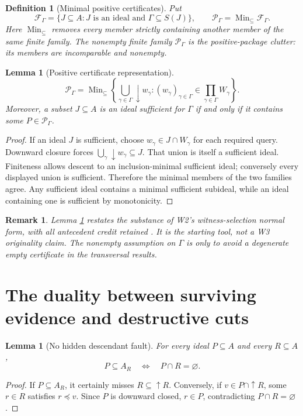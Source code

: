 \documentclass[11pt,letterpaper]{article}
\newtheorem{lemma}[theorem]{Lemma}
\newtheorem{definition}[theorem]{Definition}
\newtheorem{remark}[theorem]{Remark}
\DeclareMathOperator{\Min}{Min}
\newcommand{\calP}{\mathcal P}
\newcommand{\Gam}{\Gamma}
\begin{document}
\begin{definition}[Minimal positive certificates]\label{def:positive}
Put
\[
\mathcal F_\Gam=\{J\subseteq A:J\text{ is an ideal and }\Gam\subseteq S(J)\},
\qquad
\calP_\Gam=\Min_{\subseteq}\mathcal F_\Gam.
\]
Here $\Min_{\subseteq}$ removes every member strictly containing another member of the same finite family. The nonempty finite family $\calP_\Gam$ is the \emph{positive-package clutter}: its members are incomparable and nonempty.
\end{definition}

\begin{lemma}[Positive certificate representation]\label{lem:normal}
\[
\calP_\Gam
=\Min_{\subseteq}\left\{
\bigcup_{\gamma\in\Gam}\downarrow w_\gamma:
(w_\gamma)_{\gamma\in\Gam}\in\prod_{\gamma\in\Gam}W_\gamma
\right\}.
\tag{1}\label{eq:positive}
\]
Moreover, a subset $J\subseteq A$ is an ideal sufficient for $\Gam$ if and only if it contains some $P\in\calP_\Gam$.
\end{lemma}
\begin{proof}
If an ideal $J$ is sufficient, choose $w_\gamma\in J\cap W_\gamma$ for each required query. Downward closure forces $\bigcup_\gamma\downarrow w_\gamma\subseteq J$. That union is itself a sufficient ideal. Finiteness allows descent to an inclusion-minimal sufficient ideal; conversely every displayed union is sufficient. Therefore the minimal members of the two families agree. Any sufficient ideal contains a minimal sufficient subideal, while an ideal containing one is sufficient by monotonicity.
\end{proof}
\begin{remark}
Lemma \ref{lem:normal} restates the substance of W2's witness-selection normal form, with all antecedent credit retained \cite{W2}. It is the starting tool, \emph{not} a W3 originality claim. The nonempty assumption on $\Gam$ is only to avoid a degenerate empty certificate in the transversal results.
\end{remark}

\section{The duality between surviving evidence and destructive cuts}\label{gl-first-W3-s3}
\begin{lemma}[No hidden descendant fault]\label{lem:idealavoid}
For every ideal $P\subseteq A$ and every $R\subseteq A$,
\[
P\subseteq A_R\quad\Longleftrightarrow\quad P\cap R=\varnothing.
\tag{2}\label{eq:avoid}
\]
\end{lemma}
\begin{proof}
If $P\subseteq A_R$, it certainly misses $R\subseteq\uparrow R$. Conversely, if $v\in P\cap\uparrow R$, some $r\in R$ satisfies $r\preceq v$. Since $P$ is downward closed, $r\in P$, contradicting $P\cap R=\varnothing$.
\end{proof}
\end{document}

